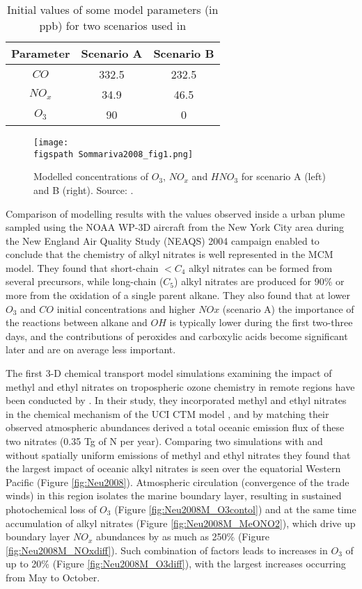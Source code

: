 \documentclass[11pt,a4paper]{article}
\newcommand{\figspath}{figures/}
\begin{document}
\begin{table}
\caption{Initial values of some model parameters (in ppb) for two scenarios used in \citep{Sommariva2008}}
\label{tab:Sommariva2008init}
\centering
\begin{tabular}{ccc}
\hline
Parameter & Scenario A & Scenario B\\
\hline
$CO$      & 332.5      & 232.5\\
$NO_x$    & 34.9       & 46.5\\
$O_3$     & 90         & 0\\
\hline
\end{tabular}
\end{table}
\begin{figure}
\texttt{[image: \\figspath Sommariva2008\_fig1.png]}
\caption{Modelled concentrations of $O_3$, $NO_x$ and $HNO_3$ for scenario A (left) and B (right). Source: \citep{Sommariva2008}.}
\label{fig:Sommariva2008fig}
\end{figure}

Comparison of modelling results with the values observed inside a urban plume sampled using the NOAA WP-3D aircraft from the New York City area during the New England Air Quality Study (NEAQS) 2004 campaign enabled \cite{Sommariva2008} to conclude that the chemistry of alkyl nitrates is well represented in the MCM model. They found that short-chain $<C_4$ alkyl nitrates can be formed from several precursors, while long-chain ($C_5$) alkyl nitrates are produced for 90\% or more from the oxidation of a single parent alkane. They also found that at lower $O_3$ and $CO$ initial concentrations and higher $NOx$ (scenario A) the importance of the reactions between alkane and $OH$ is typically lower during the first two-three days, and the contributions of peroxides and carboxylic acids become significant later and are on average less important.

The first 3-D chemical transport  model simulations examining the impact of methyl and ethyl nitrates on tropospheric ozone chemistry in remote regions have been conducted by \cite{Neu2008}. In their study, they incorporated methyl and ethyl nitrates in the chemical mechanism of the UCI CTM model \citep{Carver1997}, and by matching their observed atmospheric abundances derived a total oceanic emission flux of these two nitrates (0.35 Tg of N per year). Comparing two simulations with and without spatially uniform emissions of methyl and ethyl nitrates they found that the largest impact of oceanic alkyl nitrates is seen over the equatorial Western Pacific (Figure \ref{fig:Neu2008}). Atmospheric circulation (convergence of the trade winds) in this region isolates the marine boundary layer, resulting in sustained photochemical loss of $O_3$ (Figure \ref{fig:Neu2008M_O3contol}) and at the same time accumulation of alkyl nitrates (Figure \ref{fig:Neu2008M_MeONO2}), which drive up boundary layer $NO_x$ abundances by as much as 250\% (Figure \ref{fig:Neu2008M_NOxdiff}). Such combination of factors leads to increases in $O_3$ of up to 20\% (Figure \ref{fig:Neu2008M_O3diff}), with the largest increases occurring from May to October.
\end{document}

